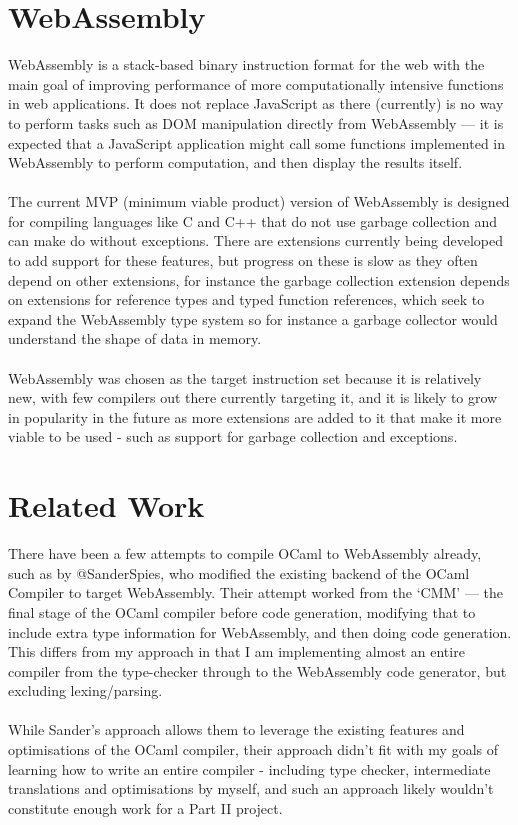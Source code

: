 \documentclass[12pt,twoside,notitlepage]{report}
\begin{document}
\section{WebAssembly}
WebAssembly\cite{webassembly} is a stack-based binary instruction format for the web with the main goal of improving performance  of  more  computationally  intensive  functions  in  web  applications.  It  does not  replace  JavaScript  as  there  (currently)  is  no  way  to  perform  tasks  such  as  DOM manipulation  directly  from  WebAssembly  ---  it  is  expected  that  a  JavaScript  application might  call  some  functions  implemented  in  WebAssembly  to  perform  computation,  and then display the results itself.
\\\\
The current MVP (minimum viable product) version of WebAssembly is designed for compiling languages like C and C++ that do not use garbage collection and can make do without exceptions. There are extensions currently being developed to add support for these features, but progress on these is slow as they often depend on other extensions, for instance the garbage collection extension depends on extensions for reference types and typed function references, which seek to expand the WebAssembly type system so for instance a garbage collector would understand the shape of data in memory.\cite{Wgce}
\\\\
WebAssembly was chosen as the target instruction set because it is relatively new, with few compilers out there currently targeting it, and it is likely to grow in popularity in the future as more extensions are added to it that make it more viable to be used - such as support for garbage collection and exceptions.




\section{Related Work}

There have been a few attempts to compile OCaml to WebAssembly already, such as by @SanderSpies\cite{Awbfo}, who modified the existing backend of the OCaml Compiler to target WebAssembly. Their attempt worked from the `CMM' --- the final stage of the OCaml compiler before code generation, modifying that to include extra type information for WebAssembly, and then doing code generation. This differs from my approach in that I am implementing almost an entire compiler from the type-checker through to the WebAssembly code generator, but excluding lexing/parsing.
\\\\
While Sander's approach allows them to leverage the existing features and optimisations of the OCaml compiler, their approach didn't fit with my goals of learning how to write an entire compiler - including type checker, intermediate translations and optimisations by myself, and such an approach likely wouldn't constitute enough work for a Part II project.
\end{document}
